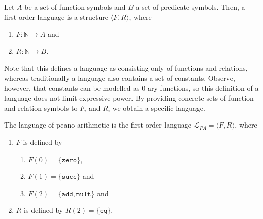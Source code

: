 
\begin{definition}\label{def:fol}
    \leanok
    Let $A$ be a set of function symbols and $B$ a set of predicate symbols. Then, a first-order language is a structure $\langle F, R \rangle$, where 
        \begin{enumerate}
            \item $F : \mathbb{N} \to A$ and
            \item $R : \mathbb{N} \to B$.
        \end{enumerate}

\end{definition}

Note that this defines a language as consisting only of functions and relations, whereas traditionally a language also contains a set of constants. Observe, however, that constants can be modelled as $0$-ary functions, so this definition of a language does not limit expressive power. By providing concrete sets of function and relation symbols to $F_i$ and $R_i$ we obtain a specific language.

\begin{definition}\label{def:lpa}
    \leanok
    The language of peano arithmetic is the first-order language $\mathcal{L}_{PA} = \langle F, R \rangle$, where
    \begin{enumerate}
        \item $F$ is defined by
        \begin{enumerate}
            \item $F(0) = \{\texttt{zero}\}$,
            \item $F(1) = \{\texttt{succ}\}$ and
            \item $F(2) = \{\texttt{add},\texttt{mult}\}$ and    
        \end{enumerate}
        \item $R$ is defined by $R(2) = \{\texttt{eq}\}$.
    \end{enumerate}
\end{definition} 

